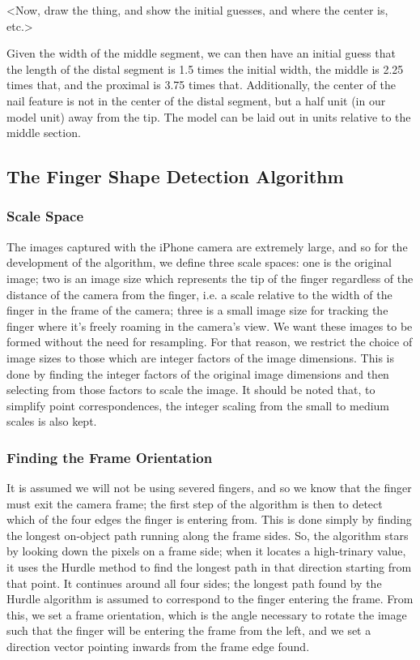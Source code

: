 <Now, draw the thing, and show the initial guesses, and where the center is, etc.> 

Given the width of the middle segment, we can then have an initial guess that the length of the distal segment is 1.5 times the initial width, the middle is 2.25 times that, and the proximal is 3.75 times that. Additionally, the center of the nail feature is not in the center of the distal segment, but a half unit (in our model unit) away from the tip. The model can be laid out in units relative to the middle section.
\subsection{The Finger Shape Detection Algorithm}\label{sec:FingerShapeDetectionAlgorithm}

\subsubsection{Scale Space}\label{sec:ScaleSpace}
The images captured with the iPhone camera are extremely large, and so for the development of the algorithm, we define three scale spaces: one is the original image; two is an image size which represents the tip of the finger regardless of the distance of the camera from the finger, i.e. a scale relative to the width of the finger in the frame of the camera; three is a small image size for tracking the finger where it's freely roaming in the camera's view. We want these images to be formed without the need for resampling. For that reason, we restrict the choice of image sizes to those which are integer factors of the image dimensions. This is done by finding the integer factors of the original image dimensions and then selecting from those factors to scale the image. It should be noted that, to simplify point correspondences, the integer scaling from the small to medium scales is also kept.

\subsubsection{Finding the Frame Orientation}\label{sec:FindingTheFrameOrientation}
It is assumed we will not be using severed fingers, and so we know that the finger must exit the camera frame; the first step of the algorithm is then to detect which of the four edges the finger is entering from. This is done simply by finding the longest on-object path running along the frame sides. So, the algorithm stars by looking down the pixels on a frame side; when it locates a high-trinary value, it uses the Hurdle method to find the longest path in that direction starting from that point. It continues around all four sides; the longest path found by the Hurdle algorithm is assumed to correspond to the finger entering the frame. From this, we set a frame orientation, which is the angle necessary to rotate the image such that the finger will be entering the frame from the left, and we set a direction vector pointing inwards from the frame edge found.

